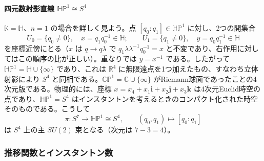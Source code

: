 \documentclass[uplatex, dvipdfmx, book]{jsbook}
\let\origsubsubsection\subsubsection
\renewcommand{\subsection}{\origsubsubsection}
\renewcommand{\subsubsection}{\paragraph}
\begin{document}
\paragraph{四元数射影直線 $\mathbb{HP}^1 \cong S^4$}
$\mathbb{K} = \mathbb{H}$、$n = 1$ の場合を詳しく見よう。点 $[q_0 : q_1] \in \mathbb{HP}^1$ に対し、2つの開集合
\begin{equation}
    U_0 = \{ q_0 \neq 0 \}, \quad x = q_1 q_0^{-1} \in \mathbb{H}; \qquad U_1 = \{ q_1 \neq 0 \}, \quad y = q_0 q_1^{-1} \in \mathbb{H}
\end{equation}
を座標近傍にとる（$x$ は $q \to q\lambda$ で $q_1\lambda\lambda^{-1}q_0^{-1} = x$ と不変であり、右作用に対してはこの順序の比が正しい）。重なりでは $y = x^{-1}$ である。したがって $\mathbb{HP}^1 = \mathbb{H} \cup \{\infty\}$ であり、これは $\mathbb{R}^4$ に無限遠点を1つ加えたもの、すなわち立体射影により $S^4$ と同相である。$\mathbb{CP}^1 = \mathbb{C} \cup \{\infty\}$ がRiemann球面であったことの4次元版である。物理的には、座標 $x = x_4 + x_1\bm{i} + x_2\bm{j} + x_3\bm{k}$ は4次元Euclid時空の点であり、$\mathbb{HP}^1 = S^4$ はインスタントンを考えるときのコンパクト化された時空そのものである。こうして
\begin{equation}
    \pi: S^7 \to \mathbb{HP}^1 \cong S^4, \qquad (q_0, q_1) \mapsto [q_0 : q_1]
\end{equation}
は $S^4$ 上の主 $SU(2)$ 束となる（次元は $7 - 3 = 4$）。

\subsection{推移関数とインスタントン数}
\end{document}
